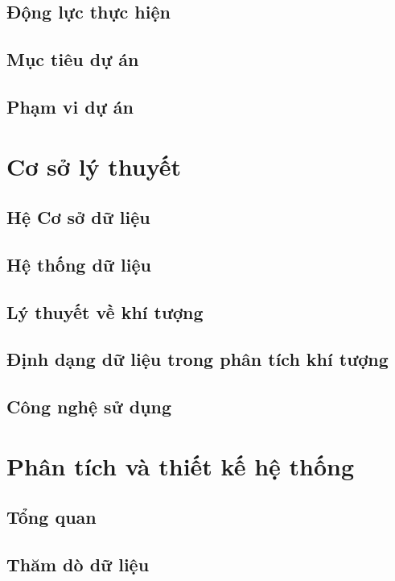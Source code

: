 \documentclass[12pt, a4paper]{report}
\theoremstyle{definition}
\begin{document}
\section{Động lực thực hiện}

\section{Mục tiêu dự án}

\section{Phạm vi dự án}


\newpage
\chapter{Cơ sở lý thuyết}
\section{Hệ Cơ sở dữ liệu}

\section{Hệ thống dữ liệu}

\section{Lý thuyết về khí tượng}

\section{Định dạng dữ liệu trong phân tích khí tượng}

\section{Công nghệ sử dụng}


\newpage
\chapter{Phân tích và thiết kế hệ thống}
\section{Tổng quan}

\section{Thăm dò dữ liệu}

\end{document}
